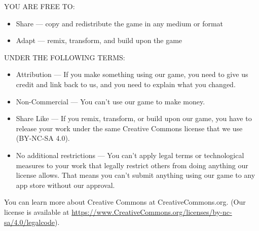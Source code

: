 \documentclass[13pt,a4paper,twocolumn,titlepage]{scrartcl}
\begin{document}
	\textcolor{Blue3}{YOU ARE FREE TO:}
	\begin{itemize}
		\item \textcolor{Blue3}{Share} — copy and redistribute the game in any medium or format
		\item \textcolor{Blue3}{Adapt} — remix, transform, and build upon the
		game
	\end{itemize}
	\textcolor{Blue3}{UNDER THE FOLLOWING TERMS:}
	\begin{itemize}
		\item \textcolor{Blue3}{Attribution} — If you make something using our game, you need to give us credit and link back to us, and you need to explain what you changed.
		\item \textcolor{Blue3}{Non-Commercial} — You can’t use our game to	make money.
		\item \textcolor{Blue3}{Share Like} — If you remix, transform, or build upon our game, you have to release your work under the same Creative Commons license	that we use (BY-NC-SA 4.0).
		\item \textcolor{Blue3}{No additional restrictions} — You can’t apply legal terms or technological measures to your work that legally restrict others from doing anything our license allows. That means you can’t submit anything using our game to any app store without our approval.
	\end{itemize}

	You can learn more about Creative Commons at CreativeCommons.org. (Our license is available at \url{https://www.CreativeCommons.org/licenses/by-nc-sa/4.0/legalcode}).
\end{document}
